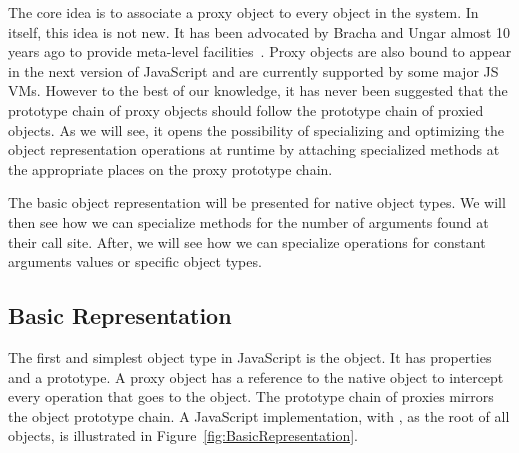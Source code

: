 The core idea is to associate a proxy object to every object in the system. In
itself, this idea is not new. It has been advocated by Bracha and Ungar almost
10 years ago to provide meta-level facilities~\cite{Bracha:2004vp}. Proxy
objects are also bound to appear in the next version of JavaScript and are
currently supported by some major JS VMs.
However to the best of our knowledge, it has never been suggested that the
prototype chain of proxy objects should follow the prototype chain of proxied
objects. As we will see, it opens the possibility of specializing and
optimizing the object representation operations at runtime by attaching
specialized methods at the appropriate places on the proxy prototype chain.

The basic object representation will be presented for native object types. We
will then see how we can specialize methods for the number of arguments found
at their call site.  After, we will see how we can specialize operations for
constant arguments values or specific object types.

\subsection{Basic Representation}

The first and simplest object type in JavaScript is the object. It has
properties and a prototype. A proxy object has a reference to the native object
to intercept every operation that goes to the object. The prototype chain of
proxies mirrors the object prototype chain. A JavaScript implementation, with
, as the root of all objects, is illustrated in
Figure~\ref{fig:BasicRepresentation}.

